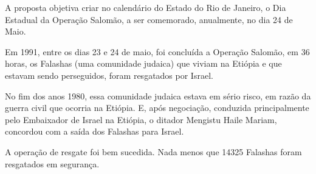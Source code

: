 \documentclass[10pt]{article}
\begin{document}
  A proposta objetiva criar no calendário do Estado do Rio de Janeiro, o Dia Estadual da Operação Salomão, a ser comemorado, anualmente, no dia 24 de Maio.

Em 1991, entre os dias 23 e 24 de maio, foi concluída a Operação Salomão, em 36 horas,  os Falashas (uma comunidade judaica) que viviam na Etiópia e que estavam sendo perseguidos, foram resgatados por Israel.

No fim dos anos 1980, essa comunidade judaica estava em sério risco, em razão da guerra civil que ocorria na Etiópia. E, após negociação, conduzida principalmente pelo Embaixador de Israel na Etiópia, o ditador  Mengistu Haile Mariam, concordou com a saída dos Falashas para Israel.


A operação de resgate foi bem sucedida. Nada menos que 14325 Falashas foram resgatados em segurança.




\iffalse
\begin{center}
  \textbf{REFERÊNCIAS}
\end{center}


\fi
\end{document}
